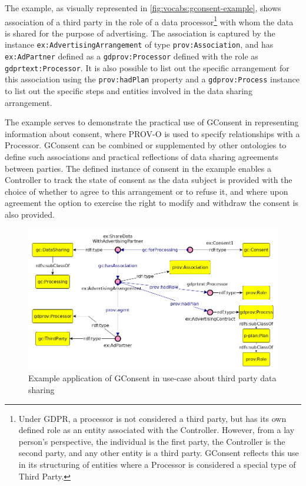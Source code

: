 The example, as visually represented in \autoref{fig:vocabs:gconsent-example}, shows association of a third party in the role of a data processor\footnote{Under GDPR, a processor is not considered a third party, but has its own defined role as an entity associated with the Controller. However, from a lay person's perspective, the individual is the first party, the Controller is the second party, and any other entity is a third party. GConsent reflects this use in its structuring of entities where a Processor is considered a special type of Third Party.}
with whom the data is shared for the purpose of advertising. The association is captured by the instance \texttt{ex:AdvertisingArrangement} of type \texttt{prov:Association}, and has \texttt{ex:AdPartner} defined as a \texttt{gdprov:Processor} defined with the role as \texttt{gdprtext:Processor}. It is also possible to list out the specific arrangement for this association using the \texttt{prov:hadPlan} property and a \texttt{gdprov:Process} instance to list out the specific steps and entities involved in the data sharing arrangement.

The example serves to demonstrate the practical use of GConsent in representing information about consent, where PROV-O is used to specify relationships with a Processor. GConsent can be combined or supplemented by other ontologies to define such associations and practical reflections of data sharing agreements between parties. The defined instance of consent in the example enables a Controller to track the state of consent as the data subject is provided with the choice of whether to agree to this arrangement or to refuse it, and where upon agreement the option to exercise the right to modify and withdraw the consent is also provided.
\begin{figure}[htbp]
    \centering
    \includegraphics[width=0.8\linewidth]{img/gconsent_third_party_datasharing.png}
    \caption{Example application of GConsent in use-case about third party data sharing \cite{}}
    \label{fig:vocabs:gconsent-example}
\end{figure}

